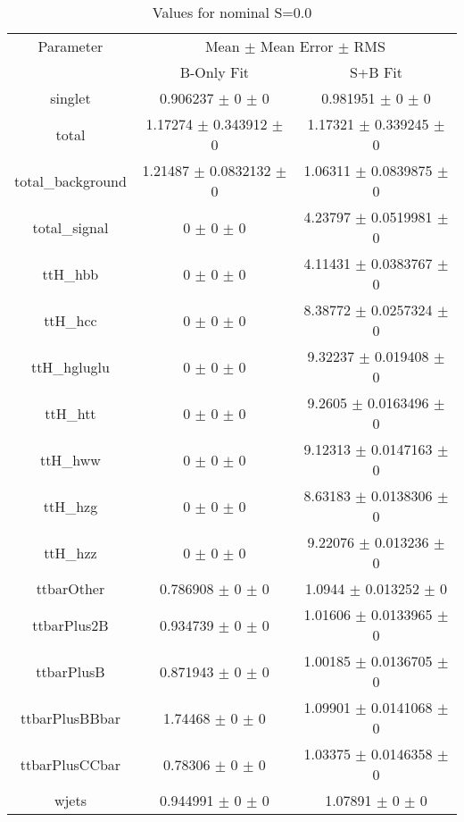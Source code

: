 \begin{table}
\centering
\caption{Values for nominal S=0.0}
\begin{tabular}{ccc}
\toprule
Parameter & \multicolumn{2}{c}{Mean $\pm$ Mean Error $\pm$ RMS}\\
 & B-Only Fit & S+B Fit\\
\midrule
singlet & \num{0.906237} $\pm$ \num{0} $\pm$ \num{0} & \num{0.981951} $\pm$ \num{0} $\pm$ \num{0}\\
total & \num{1.17274} $\pm$ \num{0.343912} $\pm$ \num{0} & \num{1.17321} $\pm$ \num{0.339245} $\pm$ \num{0}\\
total\_background & \num{1.21487} $\pm$ \num{0.0832132} $\pm$ \num{0} & \num{1.06311} $\pm$ \num{0.0839875} $\pm$ \num{0}\\
total\_signal & \num{0} $\pm$ \num{0} $\pm$ \num{0} & \num{4.23797} $\pm$ \num{0.0519981} $\pm$ \num{0}\\
ttH\_hbb & \num{0} $\pm$ \num{0} $\pm$ \num{0} & \num{4.11431} $\pm$ \num{0.0383767} $\pm$ \num{0}\\
ttH\_hcc & \num{0} $\pm$ \num{0} $\pm$ \num{0} & \num{8.38772} $\pm$ \num{0.0257324} $\pm$ \num{0}\\
ttH\_hgluglu & \num{0} $\pm$ \num{0} $\pm$ \num{0} & \num{9.32237} $\pm$ \num{0.019408} $\pm$ \num{0}\\
ttH\_htt & \num{0} $\pm$ \num{0} $\pm$ \num{0} & \num{9.2605} $\pm$ \num{0.0163496} $\pm$ \num{0}\\
ttH\_hww & \num{0} $\pm$ \num{0} $\pm$ \num{0} & \num{9.12313} $\pm$ \num{0.0147163} $\pm$ \num{0}\\
ttH\_hzg & \num{0} $\pm$ \num{0} $\pm$ \num{0} & \num{8.63183} $\pm$ \num{0.0138306} $\pm$ \num{0}\\
ttH\_hzz & \num{0} $\pm$ \num{0} $\pm$ \num{0} & \num{9.22076} $\pm$ \num{0.013236} $\pm$ \num{0}\\
ttbarOther & \num{0.786908} $\pm$ \num{0} $\pm$ \num{0} & \num{1.0944} $\pm$ \num{0.013252} $\pm$ \num{0}\\
ttbarPlus2B & \num{0.934739} $\pm$ \num{0} $\pm$ \num{0} & \num{1.01606} $\pm$ \num{0.0133965} $\pm$ \num{0}\\
ttbarPlusB & \num{0.871943} $\pm$ \num{0} $\pm$ \num{0} & \num{1.00185} $\pm$ \num{0.0136705} $\pm$ \num{0}\\
ttbarPlusBBbar & \num{1.74468} $\pm$ \num{0} $\pm$ \num{0} & \num{1.09901} $\pm$ \num{0.0141068} $\pm$ \num{0}\\
ttbarPlusCCbar & \num{0.78306} $\pm$ \num{0} $\pm$ \num{0} & \num{1.03375} $\pm$ \num{0.0146358} $\pm$ \num{0}\\
wjets & \num{0.944991} $\pm$ \num{0} $\pm$ \num{0} & \num{1.07891} $\pm$ \num{0} $\pm$ \num{0}\\
\bottomrule
\end{tabular}
\end{table}